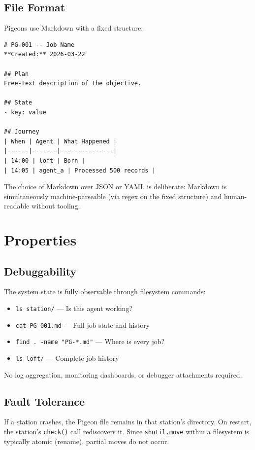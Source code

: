 \documentclass[11pt,a4paper]{article}
\begin{document}
\subsection{File Format}

Pigeons use Markdown with a fixed structure:

\begin{lstlisting}
# PG-001 -- Job Name
**Created:** 2026-03-22

## Plan
Free-text description of the objective.

## State
- key: value

## Journey
| When | Agent | What Happened |
|------|-------|---------------|
| 14:00 | loft | Born |
| 14:05 | agent_a | Processed 500 records |
\end{lstlisting}

The choice of Markdown over JSON or YAML is deliberate: Markdown is simultaneously machine-parseable (via regex on the fixed structure) and human-readable without tooling.

\section{Properties}

\subsection{Debuggability}

The system state is fully observable through filesystem commands:

\begin{itemize}
    \item \texttt{ls station/} --- Is this agent working?
    \item \texttt{cat PG-001.md} --- Full job state and history
    \item \texttt{find . -name "PG-*.md"} --- Where is every job?
    \item \texttt{ls loft/} --- Complete job history
\end{itemize}

No log aggregation, monitoring dashboards, or debugger attachments required.

\subsection{Fault Tolerance}

If a station crashes, the Pigeon file remains in that station's directory. On restart, the station's \texttt{check()} call rediscovers it. Since \texttt{shutil.move} within a filesystem is typically atomic (rename), partial moves do not occur.
\end{document}
